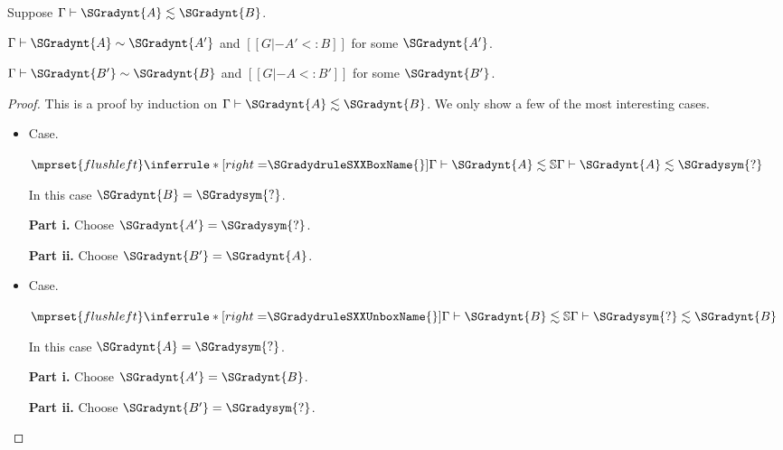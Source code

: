 \begin{lemma}
  \label{lemma:consistent-subtyping-1}
  Suppose $ \Gamma  \vdash  \SGradynt{A}  \lesssim  \SGradynt{B} $.
  \begin{enumR}
    \item $ \Gamma  \vdash  \SGradynt{A}  \sim  \SGradynt{A'} $ and $[[G |- A' <: B]]$ for some $\SGradynt{A'}$.
    \item $ \Gamma  \vdash  \SGradynt{B'}  \sim  \SGradynt{B} $ and $[[G |- A <: B']]$ for some $\SGradynt{B'}$.
  \end{enumR}   
\end{lemma}
\begin{proof}
  This is a proof by induction on $ \Gamma  \vdash  \SGradynt{A}  \lesssim  \SGradynt{B} $.  We only show a
  few of the most interesting cases.
  \begin{itemize}
  \item[] Case.\ \\ 
    \begin{center}
      \begin{math}
        $$\mprset{flushleft}
        \inferrule* [right=$\SGradydruleSXXBoxName{}$] {
           \Gamma  \vdash  \SGradynt{A}  \lesssim   \mathbb{S}  
        }{ \Gamma  \vdash  \SGradynt{A}  \lesssim  \SGradysym{\mbox{?}} }
      \end{math}
    \end{center}
    In this case $\SGradynt{B} = \SGradysym{\mbox{?}}$.

    \noindent
    \textbf{Part i.} Choose $\SGradynt{A'} = \SGradysym{\mbox{?}}$.

    \noindent
    \textbf{Part ii.} Choose $\SGradynt{B'} = \SGradynt{A}$.

  \item[] Case.\ \\ 
    \begin{center}
      \begin{math}
        $$\mprset{flushleft}
        \inferrule* [right=$\SGradydruleSXXUnboxName{}$] {
           \Gamma  \vdash  \SGradynt{B}  \lesssim   \mathbb{S}  
        }{ \Gamma  \vdash  \SGradysym{\mbox{?}}  \lesssim  \SGradynt{B} }
      \end{math}
    \end{center}
    In this case $\SGradynt{A} = \SGradysym{\mbox{?}}$.

    \noindent
    \textbf{Part i.} Choose $\SGradynt{A'} = \SGradynt{B}$.

    \noindent
    \textbf{Part ii.} Choose $\SGradynt{B'} = \SGradysym{\mbox{?}}$.


\end{itemize}
\end{proof}
